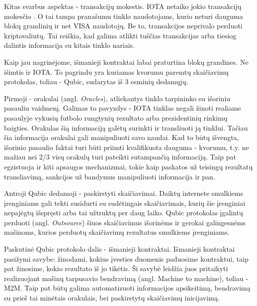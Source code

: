 Kitas svarbus aspektas - transakcijų mokestis. IOTA netaiko jokio transakcijų mokesčio \cite{zivic2019distributed}. O tai tampa pranašumu tinklo naudotojams, kurio neturi dauguma blokų grandinių ir net VISA naudotojų. Be to, transakcijos neprivalo perduoti kriptovaliutų. Tai reiškia, kad galima atlikti tuščias transakcijas arba tiesiog dalintis informacija su kitais tinklo nariais.





Kaip jau nagrinėjome, išmanieji kontraktai labai praturtina blokų grandines. Ne išimtis ir IOTA. To pagrindu yra kuriamas kvorumu paremtų skaičiavimų protokolas, toliau - Qubic, sudarytas iš 3 esminių dedamųjų.

Pirmoji - orakulai (angl. \textit{Oracles}), atliekantys tinklo tarpininko su išoriniu pasauliu vaidmenį. Galimas to pavyzdys - IOTA tinklas negali žinoti realiame pasaulyje vykusių futbolo rungtynių rezultato arba prezidentinių rinkimų baigties. Orakulas šią informaciją galėtų surinkti ir transliuoti ją tinklui. Tačiau šia informacija orakulai gali manipuliuoti savo naudai. Kad to būtų išvengta, išorinio pasaulio faktai turi būti priimti kvalifikuota dauguma - kvorumu, t.y. ne mažiau nei 2/3 visų orakulų turi pateikti sutampančią informaciją. Taip pat egzistuoja ir kiti apsaugos mechanizmai, tokie kaip paskatos už teisingų rezultatų transliavimą, sankcijos už bandymus manipuliuoti informacija ir pan.

Antroji Qubic dedamoji - paskirstyti skaičiavimai. Daiktų internete smulkiems įrenginiams gali tekti susidurti su sudėtingais skaičiavimais, kurių šie įrenginiai nepajėgtų išspręsti arba tai užtruktų per daug laiko. Qubic protokolas įgalintų perduoti (angl. \textit{Outsource}) šiuos skaičiavimus išorinėms ir gerokai galingesnėms mašinoms, kurios perduotų skaičiavimų rezultatus smulkiems įrenginiams.

Paskutinė Qubic protokolo dalis - išmanieji kontraktai. Išmanieji kontraktai pasižymi savybe: žinodami, kokius įvesties duomenis paduosime kontraktui, taip pat žinosime, kokio rezultato iš jo tikėtis. Ši savybė leidžia juos pritaikyti realizuojant mašinų tarpusavio bendravimą (angl. Machine to machine), toliau - M2M. Taip pat būtų galima automatizuoti informacijos apsikeitimą, bendravimą su prieš tai minėtais orakulais, bei paskirstytų skaičiavimų inicijavimą.


